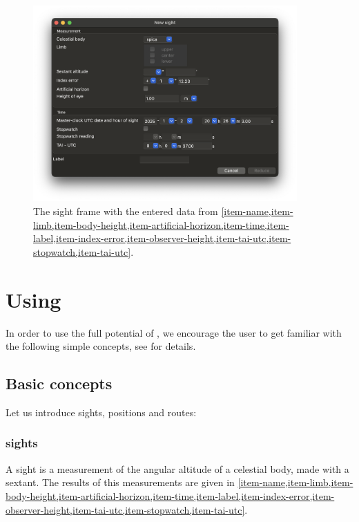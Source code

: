 \documentclass{ol-softwaremanual}
\begin{document}
  \begin{figure}
    \centering
    \includegraphics[width=0.9\textwidth]{figures/sight-frame.png}
    \caption{
      \label{fig-sight-frame}
      The \gls{sight} frame with the entered data from \cref{item-name,item-limb,item-body-height,item-artificial-horizon,item-time,item-label,item-index-error,item-observer-height,item-tai-utc,item-stopwatch,item-tai-utc}. 
    }
  \end{figure}

\section{Using \thel}


In order to use the full potential of \thel, we encourage the user to get familiar with the following simple concepts, see \cite{bowditch2002the} for details. 

\subsection{Basic concepts}

Let us introduce \glspl{sight}, positions and routes: 
\subsubsection{\Glspl{sight}} \label{section-sights} 

A \gls{sight} is a measurement of the angular altitude of a celestial \gls{body}, made with a sextant. 
The results of this measurements are given in  \cref{item-name,item-limb,item-body-height,item-artificial-horizon,item-time,item-label,item-index-error,item-observer-height,item-tai-utc,item-stopwatch,item-tai-utc}. 
\end{document}
